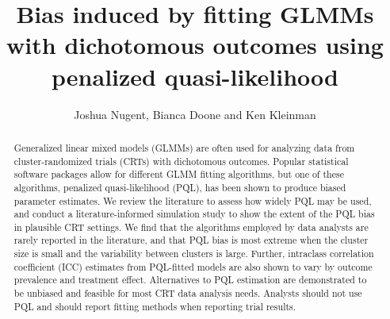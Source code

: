 \documentclass[Afour,times,sagev,doublespace]{sagej}
\begin{document}

\title{Bias induced by fitting GLMMs with dichotomous outcomes using penalized quasi-likelihood}

\author{Joshua Nugent, Bianca Doone and Ken Kleinman}





\begin{abstract}
Generalized linear mixed models (GLMMs) are often used for analyzing data from cluster-randomized trials (CRTs) with dichotomous outcomes. Popular statistical software packages allow for different GLMM fitting algorithms, but one of these algorithms, penalized quasi-likelihood (PQL), has been shown to produce biased parameter estimates. We review the literature to assess how widely PQL may be used, and conduct a literature-informed simulation study to show the extent of the PQL bias in plausible CRT settings. We find that the algorithms employed by data analysts are rarely reported in the literature, and that PQL bias is most extreme when the cluster size is small and the variability between clusters is large. Further, intraclass correlation coefficient (ICC) estimates from PQL-fitted models are also shown to vary by outcome prevalence and treatment effect. Alternatives to PQL estimation are demonstrated to be unbiased and feasible for most CRT data analysis needs. Analysts should not use PQL and should report fitting methods when reporting trial results.
\end{abstract}


\maketitle
\end{document}

